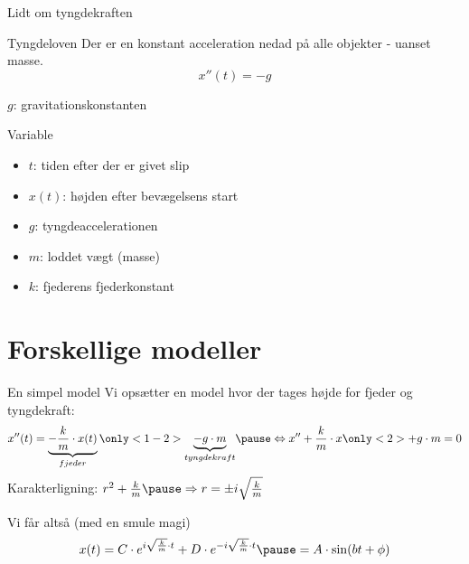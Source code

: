 \documentclass{beamer}
\begin{document}
\begin{frame}{Lidt om tyngdekraften}

\begin{center}
\hspace{2cm}
\end{center}

\begin{block}{Tyngdeloven}
Der er en konstant acceleration nedad på alle objekter - uanset masse.
$$x''(t) = -g$$

$g$: gravitationskonstanten\\
\vspace{0.2cm}

\end{block}

\end{frame}

\begin{frame}{Variable}
\begin{itemize}
	\item $t$: tiden efter der er givet slip
	\item $x(t)$: højden efter bevægelsens start
	\item $g$: tyngdeaccelerationen
	\item $m$: loddet vægt (masse)
	\item $k$: fjederens fjederkonstant
\end{itemize}

\end{frame}
\section{Forskellige modeller}
\begin{frame}{En simpel model}
Vi opsætter en model hvor der tages højde for fjeder og tyngdekraft:
$$x''(t) = \underbrace{-\dfrac{k}{m} \cdot x(t)}_{fjeder} \only<1-2>{\underbrace{-g\cdot m}_{tyngdekraft}}\pause \Leftrightarrow x''+\dfrac{k}{m}\cdot x \only<2>{+ g\cdot m}=0$$
\pause
\pause
Karakterligning: $r^2 + \frac{k}{m}\pause\Rightarrow r = \pm i \sqrt{\frac{k}{m}}$
\pause

Vi får altså (med en smule magi)
$$x(t)=C \cdot e^{i \sqrt{\frac{k}{m}}\cdot t}+D \cdot e^{-i \sqrt{\frac{k}{m}}\cdot t}\pause = A\cdot \sin (bt+\phi)$$

\end{frame}
\end{document}

